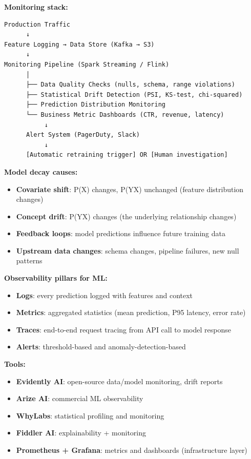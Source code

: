 \documentclass[11pt]{article}
\providecommand{\tightlist}{\setlength{\itemsep}{1pt}\setlength{\parskip}{0pt}}
\begin{document}
\textbf{Monitoring stack:}

\setcodelang{}

\begin{verbatim}
Production Traffic
      ↓
Feature Logging → Data Store (Kafka → S3)
      ↓
Monitoring Pipeline (Spark Streaming / Flink)
      │
      ├── Data Quality Checks (nulls, schema, range violations)
      ├── Statistical Drift Detection (PSI, KS-test, chi-squared)
      ├── Prediction Distribution Monitoring
      └── Business Metric Dashboards (CTR, revenue, latency)
           ↓
      Alert System (PagerDuty, Slack)
           ↓
      [Automatic retraining trigger] OR [Human investigation]
\end{verbatim}

\textbf{Model decay causes:}

\begin{itemize}
\tightlist
\item
  \textbf{Covariate shift}: P(X) changes, P(Y\textbar X) unchanged (feature distribution changes)
\item
  \textbf{Concept drift}: P(Y\textbar X) changes (the underlying relationship changes)
\item
  \textbf{Feedback loops}: model predictions influence future training data
\item
  \textbf{Upstream data changes}: schema changes, pipeline failures, new null patterns
\end{itemize}

\textbf{Observability pillars for ML:}

\begin{itemize}
\tightlist
\item
  \textbf{Logs}: every prediction logged with features and context
\item
  \textbf{Metrics}: aggregated statistics (mean prediction, P95 latency, error rate)
\item
  \textbf{Traces}: end-to-end request tracing from API call to model response
\item
  \textbf{Alerts}: threshold-based and anomaly-detection-based
\end{itemize}

\textbf{Tools:}

\begin{itemize}
\tightlist
\item
  \textbf{Evidently AI}: open-source data/model monitoring, drift reports
\item
  \textbf{Arize AI}: commercial ML observability
\item
  \textbf{WhyLabs}: statistical profiling and monitoring
\item
  \textbf{Fiddler AI}: explainability + monitoring
\item
  \textbf{Prometheus + Grafana}: metrics and dashboards (infrastructure layer)
\end{itemize}
\end{document}
